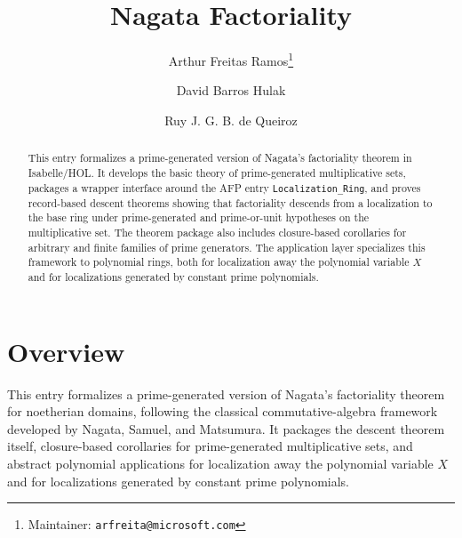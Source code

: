 \documentclass[11pt,a4paper]{article}
\begin{document}
\title{Nagata Factoriality}
\author{
  Arthur Freitas Ramos\thanks{Maintainer: \texttt{arfreita@microsoft.com}}
  \and David Barros Hulak
  \and Ruy J. G. B. de Queiroz
}
\maketitle

\begin{abstract}
  This entry formalizes a prime-generated version of Nagata's factoriality
  theorem in Isabelle/HOL.  It develops the basic theory of prime-generated
  multiplicative sets, packages a wrapper interface around the AFP entry
  \texttt{Localization\_Ring}, and proves record-based descent theorems showing
  that factoriality descends from a localization to the base ring under
  prime-generated and prime-or-unit hypotheses on the multiplicative set.  The
  theorem package also includes closure-based corollaries for arbitrary and
  finite families of prime generators.  The application layer specializes this
  framework to polynomial rings, both for localization away the polynomial
  variable \(X\) and for localizations generated by constant prime
  polynomials.
\end{abstract}

\tableofcontents

\section{Overview}

This entry formalizes a prime-generated version of Nagata's factoriality
theorem for noetherian domains, following the classical commutative-algebra
framework developed by Nagata, Samuel, and Matsumura.\cite{Nagata1962,Samuel1964,Matsumura1986}
It packages the descent theorem itself, closure-based corollaries for
prime-generated multiplicative sets, and abstract polynomial applications for
localization away the polynomial variable \(X\) and for localizations generated
by constant prime polynomials.





\end{document}
